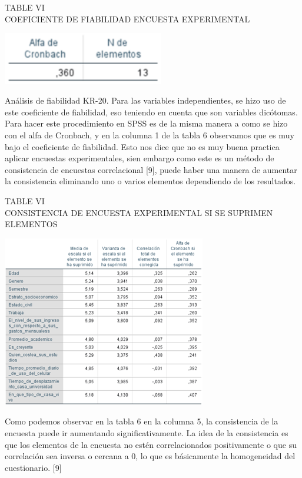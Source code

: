 \documentclass[conference]{IEEEtran}
\begin{document}
\begin{center}
\caption{TABLE VI\\
COEFICIENTE DE FIABILIDAD ENCUESTA EXPERIMENTAL}
\includegraphics[width=7cm]{imagenes/IMAGEN15.png}
\end{center}
Análisis de fiabilidad KR-20. Para las variables independientes, se hizo uso de este coeficiente de fiabilidad, eso teniendo en cuenta que son variables dicótomas. Para hacer este procedimiento en SPSS es de la misma manera a como se hizo con el alfa de Cronbach, y en la columna 1 de la tabla 6 observamos que es muy bajo el coeficiente de fiabilidad. Esto nos dice que no es muy buena practica aplicar encuestas experimentales, sien embargo como este es un método de consistencia de encuestas correlacional [9], puede haber una manera de aumentar la consistencia eliminando uno o varios elementos dependiendo de los resultados.\\

\begin{center}
\caption{TABLE VI\\
CONSISTENCIA DE ENCUESTA EXPERIMENTAL SI SE SUPRIMEN ELEMENTOS
}
\includegraphics{imagenes/tabla6.png}
\end{center}
 Como podemos observar en la tabla 6 en la columna 5, la consistencia de la encuesta puede ir aumentando significativamente. La idea de la consistencia es que los elementos de la encuesta no estén correlacionados positivamente o que su correlación sea inversa o cercana a 0, lo que es básicamente la homogeneidad del cuestionario. [9] \\
   
\end{document}
